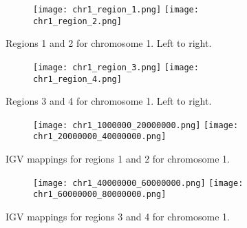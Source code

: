 \documentclass[12pt]{article}
\begin{document}
\begin{figure}[!htb]
	\begin{subfigure}{}
		\texttt{[image: chr1\_region\_1.png]}
		\texttt{[image: chr1\_region\_2.png]}
	\end{subfigure}

	\caption{Regions 1 and 2 for chromosome 1. Left to right.  }
	\label{fig:rslt_image1}
\end{figure}

\begin{figure}[!htb]
	\begin{subfigure}{}
		\texttt{[image: chr1\_region\_3.png]}
		\texttt{[image: chr1\_region\_4.png]}	
	\end{subfigure}

	\caption{Regions 3 and 4  for chromosome 1. Left to right.  }
	\label{fig:rslt_image2}
\end{figure}


\begin{figure}[!htb]
	\begin{subfigure}{}
		\texttt{[image: chr1\_1000000\_20000000.png]}
		\texttt{[image: chr1\_20000000\_40000000.png]}
	\end{subfigure}
	\caption{IGV mappings for regions 1 and 2  for chromosome 1.}
	\label{fig:rslt_image3}
\end{figure}

\begin{figure}[!htb]
	\begin{subfigure}{}
		\texttt{[image: chr1\_40000000\_60000000.png]}
		\texttt{[image: chr1\_60000000\_80000000.png]}
	\end{subfigure}
	\caption{IGV mappings for regions 3 and 4  for chromosome 1.  }
	\label{fig:rslt_image4}
\end{figure}

	
\end{document}
